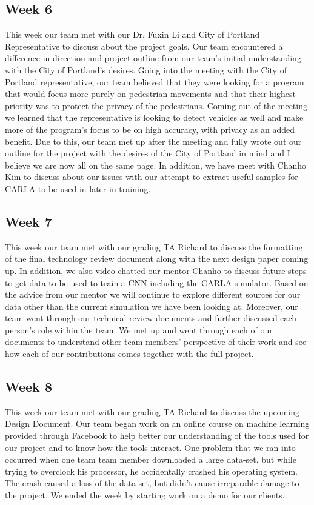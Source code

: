 \subsection{Week 6}
This week our team met with our Dr. Fuxin Li and City of Portland Representative to discuss about the project goals. Our team encountered a difference in direction and project outline from our team's initial understanding with the City of Portland’s desires. Going into the meeting with the City of Portland representative, our team believed that they were looking for a program that would focus more purely on pedestrian movements and that their highest priority was to protect the privacy of the pedestrians. Coming out of the meeting we learned that the representative is looking to detect vehicles as well and make more of the program’s focus to be on high accuracy, with privacy as an added benefit. Due to this, our team met up after the meeting and fully wrote out our outline for the project with the desires of the City of Portland in mind and I believe we are now all on the same page. In addition, we have meet with Chanho Kim to discuss about our issues with our attempt to extract useful samples for CARLA to be used in later in training.

\subsection{Week 7}
This week our team met with our grading TA Richard to discuss the formatting of the final technology review document along with the next design paper coming up. In addition, we also video-chatted our mentor Chanho to discuss future steps to get data to be used to train a CNN including the CARLA simulator. Based on the advice from our mentor we will continue to explore different sources for our data other than the current simulation we have been looking at. Moreover, our team went through our technical review documents and further discussed each person’s role within the team. We met up and went through each of our documents to understand other team members’ perspective of their work and see how each of our contributions comes together with the full project.

\subsection{Week 8}
This week our team met with our grading TA Richard to discuss the upcoming Design Document. Our team began work on an online course on machine learning provided through Facebook to help better our understanding of the tools used for our project and to know how the tools interact. One problem that we ran into occurred when one team team member downloaded a large data-set, but while trying to overclock his processor, he accidentally crashed his operating system. The crash caused a loss of the data set, but didn't cause irreparable damage to the project. We ended the week by starting work on a demo for our clients.

